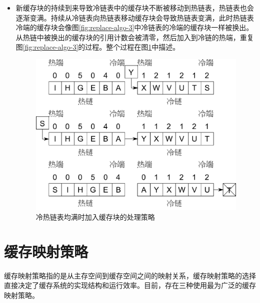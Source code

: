 \begin{itemize}
\item
新缓存块的持续到来导致冷链表中的缓存块不断被移动到热链表，热链表也会逐渐变满。持续从冷链表向热链表移动缓存块会导致热链表变满，此时热链表冷端的缓存块会像图\ref{fig:replace-algo-3}中冷链表的冷端的缓存块一样被换出。从热链中被换出的缓存块的引用计数会被清零，然后加入到冷链的热端，重复图\ref{fig:replace-algo-3}的过程。整个过程在图\ref{fig:replace-algo-4}中描述。
\begin{figure}[H]
\centering
\includegraphics[width=0.7\linewidth]{./graph/replace-algo-4}
\caption{冷热链表均满时加入缓存块的处理策略}
\label{fig:replace-algo-4}
\end{figure}
\end{itemize}

\section{缓存映射策略}
\label{sec:cache_mapping}

缓存映射策略指的是从主存空间到缓存空间之间的映射关系，缓存映射策略的选择直接决定了缓存系统的实现结构和运行效率。目前，存在三种使用最为广泛的缓存映射策略\cite{cachemap2013}。

